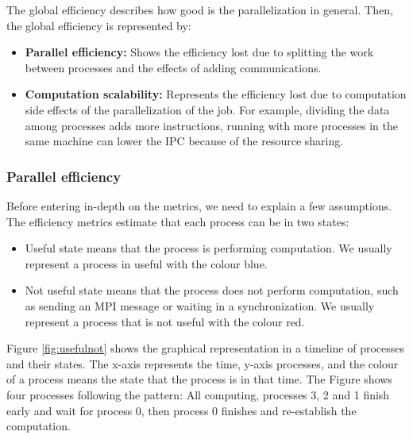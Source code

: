 The global efficiency describes how good is the parallelization in general. Then, the global efficiency is represented by:

\begin{itemize}
  \item \textbf{Parallel efficiency:} Shows the efficiency lost due to splitting the work between processes and the effects of adding communications.
  \item \textbf{Computation scalability:} Represents the efficiency lost due to computation side effects of the parallelization of the job. For example, dividing the data among processes adds more instructions, running with more processes in the same machine can lower the IPC because of the resource sharing.
\end{itemize}

\subsubsection{Parallel efficiency}
\label{pareff}

Before entering in-depth on the metrics, we need to explain a few assumptions. 
The efficiency metrics estimate that each process can be in two states:
\begin{itemize}
  \item Useful state means that the process is performing computation. We usually represent a process in useful with the colour blue.
  \item Not useful state means that the process does not perform computation, such as sending an MPI message or waiting in a synchronization. We usually represent a process that is not useful with the colour red.
\end{itemize}

Figure \ref{fig:usefulnot} shows the graphical representation in a timeline of processes and their states. The x-axis represents the time, y-axis processes, and the colour of a process means the state that the process is in that time. The Figure shows four processes following the pattern: All computing, processes 3, 2 and 1 finish early and wait for process 0, then process 0 finishes and re-establish the computation.


